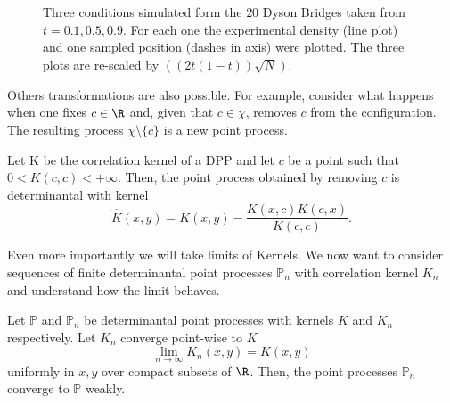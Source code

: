 \begin{exemplo}
\begin{figure}[H]
\begin{subfigure}{0.3\textwidth}
		\end{subfigure} \hfill
		\caption{Three conditions simulated form the $20$ Dyson Bridges taken from $t = 0.1, 0.5, 0.9$. For each one the experimental density (line plot) and one sampled position (dashes in axis) were plotted. The three plots are re-scaled by $((2t(1-t))\sqrt{N}).$}
	\end{figure}

\end{exemplo}

Others transformations are also possible. For example, consider what happens when one fixes $c \in \R$ and, given that $c \in \chi$, removes $c$ from the configuration. The resulting process $\chi \setminus \{c\}$ is a new point process.

\begin{proposicao} \cite{ManuelaGirottiPhD}
	Let K be the correlation kernel of a DPP and let $c$ be a point such that $0 < K(c, c) < + \infty$. Then, the point process obtained by removing $c$ is determinantal with kernel
	\begin{equation}
		\hat{K}(x, y) = K(x, y) - \frac{K(x, c) K(c, x)}{K(c, c)}.
	\end{equation}
\end{proposicao}

Even more importantly we will take limits of Kernels. We now want to consider sequences of finite determinantal point processes $\mathbb{P}_n$ with correlation kernel $K_n$ and understand how the limit behaves. 

\begin{proposicao} \cite{ManuelaGirottiPhD}
	Let $\mathbb{P}$ and $\mathbb{P}_n$ be determinantal point processes with kernels $K$ and $K_n$ respectively. Let $K_n$ converge point-wise to $K$
	\begin{equation}
		\lim_{n \rightarrow \infty} K_n(x, y) = K(x, y)
	\end{equation}
	uniformly in $x, y$ over compact subsets of $\R$. Then, the point processes $\mathbb{P}_n$ converge to $\mathbb{P}$ weakly. 
\end{proposicao}

